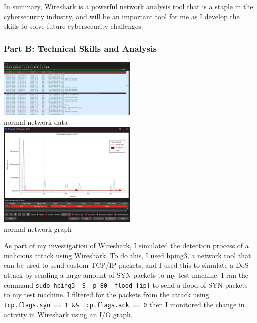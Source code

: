 \documentclass[a4paper, 11pt]{report}
\begin{document}
In summary, Wireshark is a powerful network analysis tool that is a staple in the cybersecurity industry, and will be an important tool for me as I develop the skills to solve future cybersecurity challenges.

\subsubsection{Part B: Technical Skills and Analysis}

\begin{center}
	\includegraphics[width=0.5\textwidth]{wireshark1.png} \\
	normal network data \\

	\includegraphics[width=0.5\textwidth]{wireshark2.png} \\
	normal network graph \\

\end{center}

As part of my investigation of Wireshark, I simulated the detection process of a malicious attack using Wireshark. To do this, I used hping3, a network tool that can be used to send custom TCP/IP packets, and I used this to simulate a DoS attack by sending a large amount of SYN packets to my test machine. I ran the command \texttt{sudo hping3 -S -p 80 –flood [ip]} to send a flood of SYN packets to my test machine. I filtered for the packets from the attack using \texttt{tcp.flags.syn == 1 \&\& tcp.flags.ack == 0} then I monitored the change in activity in Wireshark using an I/O graph.
\end{document}
